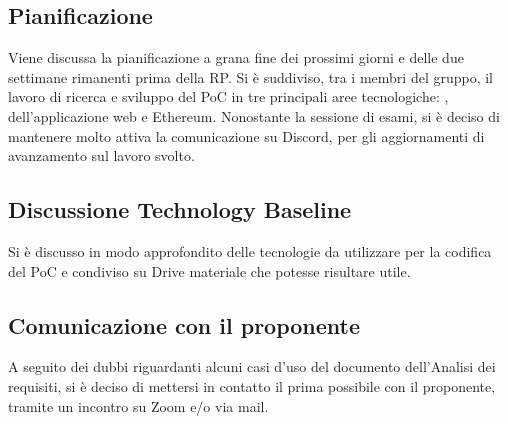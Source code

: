 \subsection*{Pianificazione}
Viene discussa la pianificazione a grana fine dei prossimi giorni e delle due settimane rimanenti prima della RP. Si è suddiviso, tra i membri del gruppo, il lavoro di ricerca e sviluppo del PoC in tre principali aree tecnologiche: ,  dell'applicazione web e Ethereum. 
Nonostante la sessione di esami, si è deciso di mantenere molto attiva la comunicazione su Discord, per gli aggiornamenti di avanzamento sul lavoro svolto.

\subsection*{Discussione Technology Baseline}
Si è discusso in modo approfondito delle tecnologie da utilizzare per la codifica del PoC e condiviso su Drive materiale che potesse risultare utile.

\subsection*{Comunicazione con il proponente}
A seguito dei dubbi riguardanti alcuni casi d'uso del documento dell'Analisi dei requisiti, si è deciso di mettersi in contatto il prima possibile con il proponente, tramite un incontro su Zoom e/o via mail.